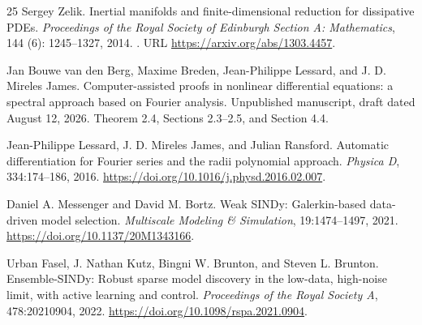 \documentclass[11pt]{article}
\begin{document}
\begin{thebibliography}{25}
Sergey Zelik.
\newblock Inertial manifolds and finite-dimensional reduction for dissipative
  {PDEs}.
\newblock \emph{Proceedings of the Royal Society of Edinburgh Section A:
  Mathematics}, 144 (6): 1245--1327, 2014.
\newblock {}.
\newblock URL \url{https://arxiv.org/abs/1303.4457}.


Jan Bouwe van den Berg, Maxime Breden, Jean-Philippe Lessard, and J. D. Mireles James.
\newblock Computer-assisted proofs in nonlinear differential equations:
a spectral approach based on Fourier analysis.
\newblock Unpublished manuscript, draft dated August 12, 2026.
\newblock Theorem 2.4, Sections 2.3--2.5, and Section 4.4.

Jean-Philippe Lessard, J. D. Mireles James, and Julian Ransford.
\newblock Automatic differentiation for Fourier series and the radii polynomial approach.
\newblock \emph{Physica D}, 334:174--186, 2016.
\newblock \url{https://doi.org/10.1016/j.physd.2016.02.007}.

Daniel A. Messenger and David M. Bortz.
\newblock Weak SINDy: Galerkin-based data-driven model selection.
\newblock \emph{Multiscale Modeling \& Simulation}, 19:1474--1497, 2021.
\newblock \url{https://doi.org/10.1137/20M1343166}.

Urban Fasel, J. Nathan Kutz, Bingni W. Brunton, and Steven L. Brunton.
\newblock Ensemble-SINDy: Robust sparse model discovery in the low-data,
high-noise limit, with active learning and control.
\newblock \emph{Proceedings of the Royal Society A}, 478:20210904, 2022.
\newblock \url{https://doi.org/10.1098/rspa.2021.0904}.

\end{thebibliography}
\end{document}
